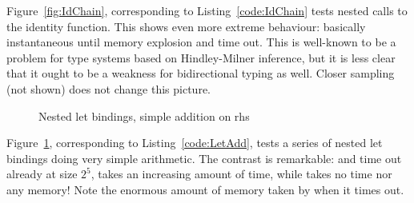 \documentclass[a4paper,UKenglish,cleveref, autoref, thm-restate,anonymous]{lipics-v2021}
\begin{document}
Figure~\ref{fig:IdChain}, corresponding to Listing~\ref{code:IdChain} tests nested calls to
the identity function. This shows even more extreme behaviour: basically instantaneous until
memory explosion and time out. This is well-known to be a problem for type systems based on
Hindley-Milner inference, but it is less clear that it ought to be a weakness for bidirectional
typing as well. Closer sampling (not shown) does not change this picture.

\begin{figure}[h]
\begin{minipage}{0.50\textwidth}
\scalebox{0.75}{}
\end{minipage}
\begin{minipage}{0.50\textwidth}
\scalebox{0.75}{}
\end{minipage}
\caption{Nested let bindings, simple addition on rhs}
\label{fig:NestedLetAdd}
\end{figure}

Figure~\ref{fig:NestedLetAdd}, corresponding to Listing~\ref{code:LetAdd}, tests a series
of nested let bindings doing very simple arithmetic. The contrast is remarkable: \agda and \idris time out already
at size \(2^5\), \lean takes an increasing amount of time, while \rocq takes no time nor any
memory! Note the enormous amount of memory taken by \agda when it times out.
\end{document}
